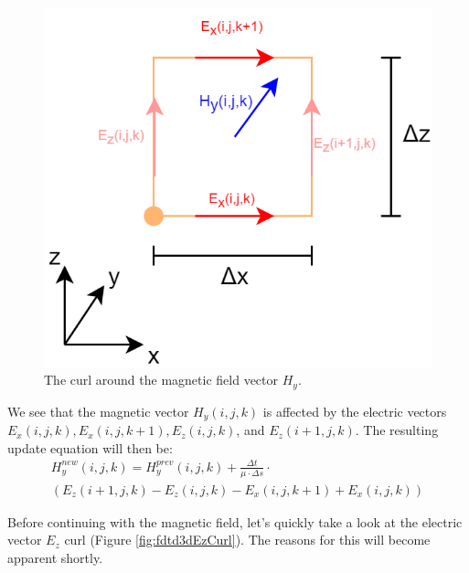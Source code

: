 \begin{figure}[h!]
	\centering
	\includegraphics[scale=0.5]{Figures/fdtd3dHyCurl}
	\decoRule
	\caption[3D $H_y$ vector curl]{The curl around the magnetic field vector $H_y$.}
	\label{fig:fdtd3dHyCurl}
\end{figure}

We see that the magnetic vector $H_y(i,j,k)$ is affected by the electric vectors $E_x(i,j,k), E_x(i,j,k+1), E_z(i,j,k)$, and $E_z(i+1,j,k)$. The resulting update equation will then be:
\begin{multline}
	\label{eqn:3dHyCurlFinal}
	H_y^{new}(i,j,k) =  H_y^{prev}(i,j,k) + \frac{\Delta t}{\mu \cdot \Delta s} \cdot \\ (E_z(i+1,j,k) - E_z(i,j,k) - E_x(i,j,k+1) + E_x(i,j,k))
\end{multline}

Before continuing with the magnetic field, let's quickly take a look at the electric vector $E_z$ curl (Figure \ref{fig:fdtd3dEzCurl}). The reasons for this will become apparent shortly.

